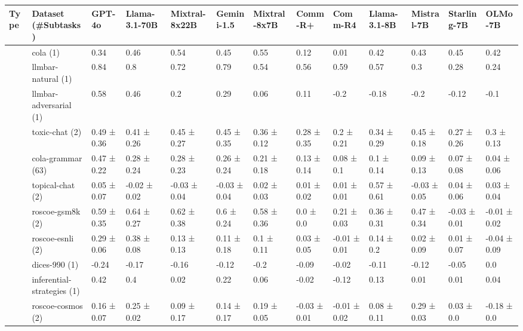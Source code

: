 \begin{tabular}{lllllllllllll}
\toprule
Type & Dataset (\#Subtasks) & GPT-4o & Llama-3.1-70B & Mixtral-8x22B & Gemini-1.5 & Mixtral-8x7B & Comm-R+ & Comm-R4 & Llama-3.1-8B & Mistral-7B & Starling-7B & OLMo-7B \\
\midrule
 & \cellcolor{blue!25}cola (1) & 0.34   & 0.46   & 0.54   & 0.45   & 0.55   & 0.12   & 0.01   & 0.42   & 0.43   & 0.45   & 0.42   \\
 & \cellcolor{blue!25}llmbar-natural (1) & 0.84   & 0.8   & 0.72   & 0.79   & 0.54   & 0.56   & 0.59   & 0.57   & 0.3   & 0.28   & 0.24   \\
 & \cellcolor{blue!25}llmbar-adversarial (1) & 0.58   & 0.46   & 0.2   & 0.29   & 0.06   & 0.11   & -0.2   & -0.18   & -0.2   & -0.12   & -0.1   \\
 & \cellcolor{blue!25}toxic-chat (2) & 0.49 ± 0.36 & 0.41 ± 0.26 & 0.45 ± 0.27 & 0.45 ± 0.35 & 0.36 ± 0.12 & 0.28 ± 0.35 & 0.2 ± 0.21 & 0.34 ± 0.29 & 0.45 ± 0.18 & 0.27 ± 0.26 & 0.3 ± 0.13 \\
 & \cellcolor{blue!25}cola-grammar (63) & 0.47 ± 0.22 & 0.28 ± 0.24 & 0.28 ± 0.23 & 0.26 ± 0.24 & 0.21 ± 0.18 & 0.13 ± 0.14 & 0.08 ± 0.1 & 0.1 ± 0.14 & 0.09 ± 0.13 & 0.07 ± 0.08 & 0.04 ± 0.06 \\
 & \cellcolor{red!25}topical-chat (2) & 0.05 ± 0.07 & -0.02 ± 0.02 & -0.03 ± 0.04 & -0.03 ± 0.04 & 0.02 ± 0.03 & 0.01 ± 0.02 & 0.01 ± 0.01 & 0.57 ± 0.61 & -0.03 ± 0.05 & 0.04 ± 0.06 & 0.03 ± 0.04 \\
 & \cellcolor{red!25}roscoe-gsm8k (2) & 0.59 ± 0.35 & 0.64 ± 0.27 & 0.62 ± 0.38 & 0.6 ± 0.24 & 0.58 ± 0.36 & 0.0 ± 0.0 & 0.21 ± 0.03 & 0.36 ± 0.31 & 0.47 ± 0.34 & -0.03 ± 0.01 & -0.01 ± 0.02 \\
 & \cellcolor{red!25}roscoe-esnli (2) & 0.29 ± 0.06 & 0.38 ± 0.08 & 0.13 ± 0.13 & 0.11 ± 0.18 & 0.1 ± 0.11 & 0.03 ± 0.05 & -0.01 ± 0.01 & 0.14 ± 0.2 & 0.02 ± 0.09 & 0.01 ± 0.07 & -0.04 ± 0.09 \\
 & \cellcolor{red!25}dices-990 (1) & -0.24   & -0.17   & -0.16   & -0.12   & -0.2   & -0.09   & -0.02   & -0.11   & -0.12   & -0.05   & 0.0   \\
 & \cellcolor{red!25}inferential-strategies (1) & 0.42   & 0.4   & 0.02   & 0.22   & 0.06   & -0.02   & -0.12   & 0.13   & 0.01   & 0.01   & 0.04   \\
 & \cellcolor{red!25}roscoe-cosmos (2) & 0.16 ± 0.07 & 0.25 ± 0.02 & 0.09 ± 0.17 & 0.14 ± 0.17 & 0.19 ± 0.05 & -0.03 ± 0.01 & -0.01 ± 0.02 & 0.08 ± 0.11 & 0.29 ± 0.03 & 0.03 ± 0.0 & -0.18 ± 0.0 \\

\end{tabular}
